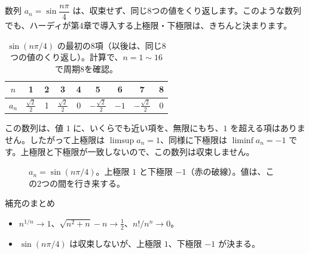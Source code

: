 \documentclass[a4paper,11pt,openany]{ltjsbook}
\begin{document}
数列 $a_n=\sin\dfrac{n\pi}4$ は、収束せず、同じ8つの値をくり返します。このような数列でも、ハーディが第4章で導入する上極限・下極限は、きちんと決まります。

\begin{table}[htbp]
\centering
\small
\begin{tabular}{c|cccccccc}
\toprule
$n$ & 1 & 2 & 3 & 4 & 5 & 6 & 7 & 8\\
\midrule
$a_n$ & $\tfrac{\sqrt2}2$ & 1 & $\tfrac{\sqrt2}2$ & 0 & $-\tfrac{\sqrt2}2$ & $-1$ & $-\tfrac{\sqrt2}2$ & 0\\
\bottomrule
\end{tabular}
\caption{$\sin(n\pi/4)$ の最初の8項（以後は、同じ8つの値のくり返し）。計算で、$n=1\sim16$ で周期8を確認。}
\end{table}

この数列は、値 $1$ に、いくらでも近い項を、無限にもち、$1$ を超える項はありません。したがって上極限は $\limsup a_n=1$、同様に下極限は $\liminf a_n=-1$ です。上極限と下極限が一致しないので、この数列は収束しません。

\begin{figure}[htbp]
\centering
{}
\caption{$a_n=\sin(n\pi/4)$。上極限 $1$ と下極限 $-1$（赤の破線）。値は、この2つの間を行き来する。}
\end{figure}

\begin{pointbox}{補充のまとめ}
\begin{itemize}[leftmargin=*]
\item $n^{1/n}\to1$、$\sqrt{n^2+n}-n\to\tfrac12$、$n!/n^n\to0$。
\item $\sin(n\pi/4)$ は収束しないが、上極限 $1$、下極限 $-1$ が決まる。
\end{itemize}
\end{pointbox}

\end{document}
